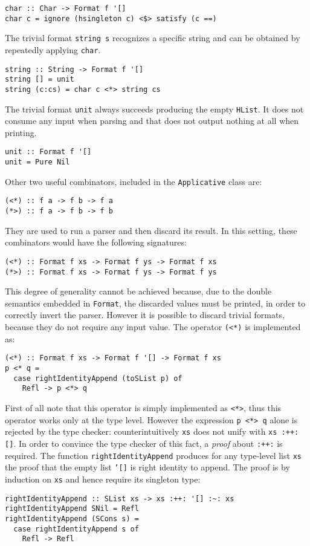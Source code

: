 \documentclass[../Thesis.tex]{subfiles}
\begin{document}
\begin{verbatim}
char :: Char -> Format f '[]
char c = ignore (hsingleton c) <$> satisfy (c ==)
\end{verbatim}

The trivial format \texttt{string s} recognizes a specific string and can be obtained by repeatedly applying \texttt{char}.

\begin{verbatim}
string :: String -> Format f '[]
string [] = unit
string (c:cs) = char c <*> string cs
\end{verbatim}

The trivial format \texttt{unit} always succeeds producing
the empty \texttt{HList}. It does not consume any input when parsing and that does not output nothing at all when printing.
\begin{verbatim}
unit :: Format f '[]
unit = Pure Nil
\end{verbatim}

Other two useful combinators, included in the \texttt{Applicative} class are:
\begin{verbatim}
(<*) :: f a -> f b -> f a
(*>) :: f a -> f b -> f b
\end{verbatim}
They are used to run a parser and then discard its result.
In this setting, these combinators would have the following signatures:
\begin{verbatim}
(<*) :: Format f xs -> Format f ys -> Format f xs
(*>) :: Format f xs -> Format f ys -> Format f ys
\end{verbatim}
This degree of generality cannot be achieved because, due to the double  semantics embedded in \texttt{Format}, the discarded values must be printed, in order to correctly invert the parser.
However it is possible to discard trivial formats, because they do not require any input value.
The operator \texttt{(<*)} is implemented as:
\begin{verbatim}
(<*) :: Format f xs -> Format f '[] -> Format f xs
p <* q = 
  case rightIdentityAppend (toSList p) of
    Refl -> p <*> q
\end{verbatim}
First of all note that this operator is simply implemented as \texttt{<*>}, thus
this operator works only at the type level.
However the expression \texttt{p <*> q} alone is rejected by the 
type checker: counterintuitively \texttt{xs} does not unify with \texttt{xs :++: []}.
In order to convince the type checker of this fact, a \emph{proof} about \texttt{:++:} is required.
The function \texttt{rightIdentityAppend} produces for any type-level list \texttt{xs} the proof that the empty list \texttt{'[]} is right identity to append.
The proof is by induction on \texttt{xs} and hence require its singleton type:
\begin{verbatim}
rightIdentityAppend :: SList xs -> xs :++: '[] :~: xs
rightIdentityAppend SNil = Refl
rightIdentityAppend (SCons s) = 
  case rightIdentityAppend s of
    Refl -> Refl
\end{verbatim}
\end{document}
